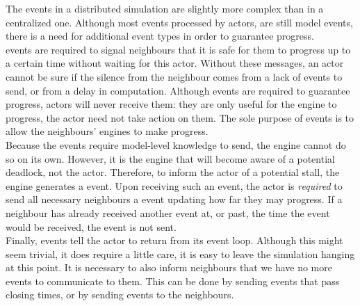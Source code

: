 The events in a distributed simulation are slightly more complex than in a centralized one.
Although most events processed by actors, are still model events, there is a need for additional event types in order to guarantee progress.\\
 events are required to signal neighbours that it is safe for them to progress up to a certain time without waiting for this actor.
Without these messages, an actor cannot be sure if the silence from the neighbour comes from a lack of events to send, or from a delay in computation.
Although  events are required to guarantee progress, actors will never receive them: they are only useful for the engine to progress, the actor need not take action on them.
The sole purpose of  events is to allow the neighbours' engines to make progress.\\
Because the  events require model-level knowledge to send, the engine cannot do so on its own.
However, it is the engine that will become aware of a potential deadlock, not the actor.
Therefore, to inform the actor of a potential stall, the engine generates a  event.
Upon receiving such an event, the actor is \emph{required} to send all necessary neighbours a  event updating how far they may progress.
If a neighbour has already received another event at, or past, the time the  event would be received, the  event is not sent.\\ %
Finally,  events tell the actor to return from its event loop.
Although this might seem trivial, it does require a little care, it is easy to leave the simulation hanging at this point.
It is necessary to also inform neighbours that we have no more events to communicate to them.
This can be done by sending  events that pass closing times, or by sending  events to the neighbours.

